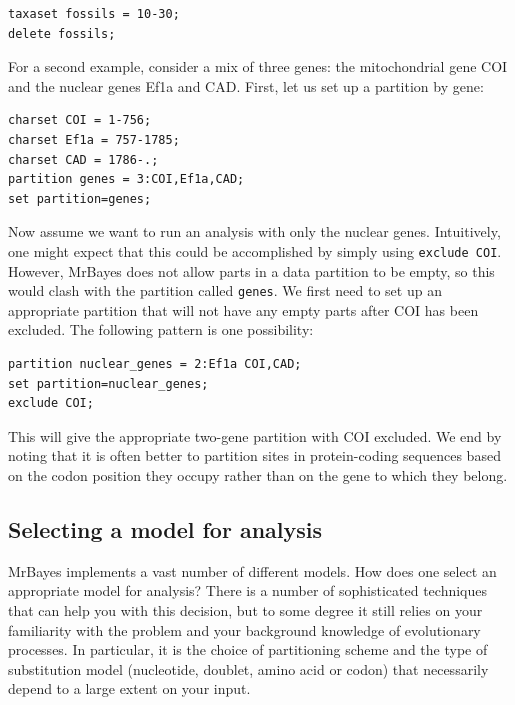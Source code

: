 \documentclass[12pt]{book}
\newcommand{\ttt}[1]{\texttt{#1}}
\begin{document}
\footnotesize
\begin{singlespacing}
\begin{verbatim}
taxaset fossils = 10-30;
delete fossils;
\end{verbatim}
\end{singlespacing}
\normalsize

For a second example, consider a mix of three genes: the mitochondrial gene COI and the nuclear
genes Ef1a and CAD. First, let us set up a partition by gene:

\footnotesize
\begin{singlespacing}
\begin{verbatim}
charset COI = 1-756;
charset Ef1a = 757-1785;
charset CAD = 1786-.;
partition genes = 3:COI,Ef1a,CAD;
set partition=genes;
\end{verbatim}
\end{singlespacing}
\normalsize

Now assume we want to run an analysis with only the nuclear genes. Intuitively, one might expect
that this could be accomplished by simply using \ttt{exclude COI}. However, MrBayes does not allow
parts in a data partition to be empty, so this would clash with the partition called \ttt{genes}.
We first need to set up an appropriate partition that will not have any empty parts after COI has
been excluded. The following pattern is one possibility:

\footnotesize
\begin{singlespacing}
\begin{verbatim}
partition nuclear_genes = 2:Ef1a COI,CAD;
set partition=nuclear_genes;
exclude COI;
\end{verbatim}
\end{singlespacing}
\normalsize

This will give the appropriate two-gene partition with COI excluded. We end by noting that it is
often better to partition sites in protein-coding sequences based on the codon position they occupy
rather than on the gene to which they belong.

\subsection{Selecting a model for analysis}

MrBayes implements a vast number of different models. How does one select an appropriate model for
analysis? There is a number of sophisticated techniques that can help you with this decision, but
to some degree it still relies on your familiarity with the problem and your background knowledge
of evolutionary processes. In particular, it is the choice of partitioning scheme and the type of
substitution model (nucleotide, doublet, amino acid or codon) that necessarily depend to a large
extent on your input.
\end{document}
